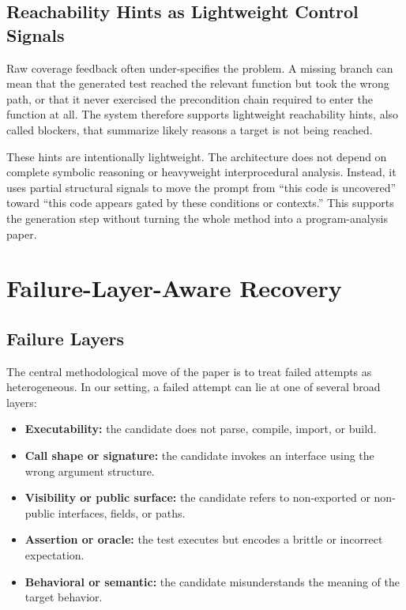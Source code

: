 \documentclass[10pt]{article}
\begin{document}
\subsection{Reachability Hints as Lightweight Control Signals}

Raw coverage feedback often under-specifies the problem. A missing branch can mean that the generated test reached the relevant function but took the wrong path, or that it never exercised the precondition chain required to enter the function at all. The system therefore supports lightweight reachability hints, also called blockers, that summarize likely reasons a target is not being reached.

These hints are intentionally lightweight. The architecture does not depend on complete symbolic reasoning or heavyweight interprocedural analysis. Instead, it uses partial structural signals to move the prompt from ``this code is uncovered'' toward ``this code appears gated by these conditions or contexts.'' This supports the generation step without turning the whole method into a program-analysis paper.

\section{Failure-Layer-Aware Recovery}
\label{sec:recovery}

\subsection{Failure Layers}

The central methodological move of the paper is to treat failed attempts as heterogeneous. In our setting, a failed attempt can lie at one of several broad layers:

\begin{itemize}[leftmargin=1.4em]
    \item \textbf{Executability:} the candidate does not parse, compile, import, or build.
    \item \textbf{Call shape or signature:} the candidate invokes an interface using the wrong argument structure.
    \item \textbf{Visibility or public surface:} the candidate refers to non-exported or non-public interfaces, fields, or paths.
    \item \textbf{Assertion or oracle:} the test executes but encodes a brittle or incorrect expectation.
    \item \textbf{Behavioral or semantic:} the candidate misunderstands the meaning of the target behavior.
\end{itemize}
\end{document}
